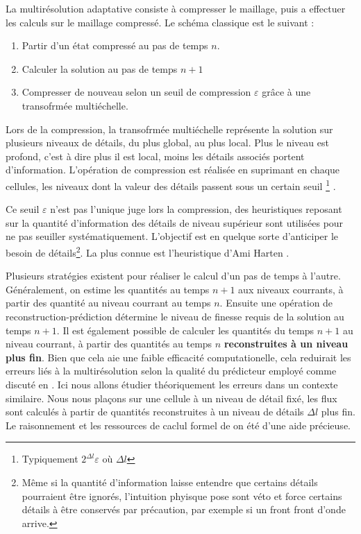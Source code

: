 La multirésolution adaptative consiste à compresser le maillage, puis a effectuer les calculs sur le maillage compressé.
Le schéma classique est le suivant : 
\begin{enumerate}
    \item Partir d'un état compressé au pas de temps $n$.
    \item Calculer la solution au pas de temps $n+1$
    \item Compresser de nouveau selon un seuil de compression $\varepsilon$ grâce à une transofrmée multiéchelle.
\end{enumerate}
Lors de la compression, la transofrmée multiéchelle représente la solution sur plusieurs niveaux de détails, du plus global, au plus local.
Plus le niveau est profond, c'est à dire plus il est local, moins les détails associés portent d'information. 
L'opération de compression est réalisée en suprimant en chaque cellules, les niveaux dont la valeur des détails
passent sous un certain seuil \footnote{Typiquement $2^{\Delta l} \varepsilon$ où ${\Delta l}$} \cite{postelApprox} .

Ce seuil $\varepsilon$ n'est pas l'unique juge lors la compression, des heuristiques reposant sur la quantité d'information des détails de niveau supérieur
sont utilisées pour ne pas seuiller systématiquement. L'objectif est en quelque sorte d'anticiper le besoin de détails\footnote{Même si la quantité d'information laisse entendre que 
certains détails pourraient être ignorés, l'intuition phyisque pose sont véto et force certains détails à être conservés par précaution, par exemple si un front front d'onde arrive.}.
La plus connue est l'heuristique d'Ami Harten \cite{harten1994}.

Plusieurs stratégies existent pour réaliser le calcul d'un pas de temps à l'autre. Généralement, on estime les quantités au temps $n+1$ aux niveaux courrants, 
à partir des quantité au niveau courrant au temps $n$. Ensuite une opération de reconstruction-prédiction détermine le niveau de finesse requis de la solution au temps $n+1$.
Il est également possible de calculer les quantités du temps $n+1$ au niveau courrant, à partir 
des quantités au temps $n$ \textbf{reconstruites à un niveau plus fin}. Bien que cela aie une faible efficacité computationelle, cela reduirait les erreurs liés à la multirésolution
selon la qualité du prédicteur employé comme discuté en \cite{belloti_et_al_2025}. Ici nous allons étudier théoriquement les erreurs dans un contexte similaire. 
Nous nous plaçons sur une cellule à un niveau de détail fixé, les flux sont calculés à partir de quantités reconstruites à un niveau de détails $\Delta l$ plus fin.
Le raisonnement et les ressources de caclul formel de \cite{belloti_et_al_2025} on été d'une aide précieuse.

